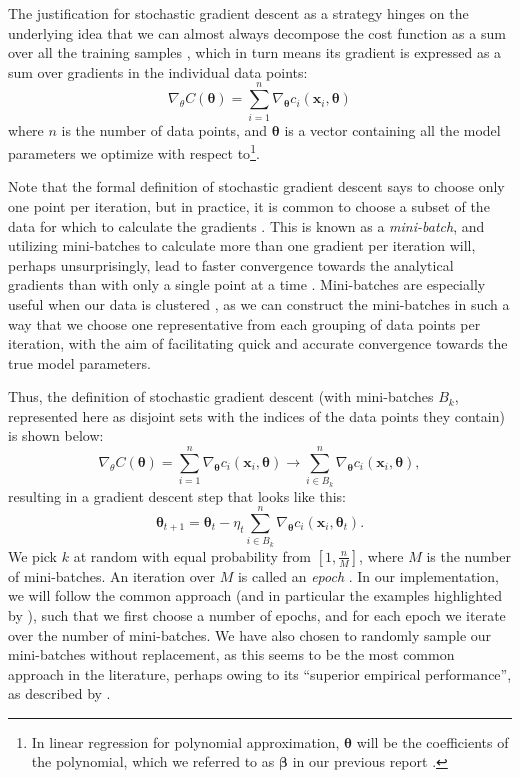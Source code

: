 The justification for stochastic gradient descent as a strategy hinges on the underlying idea that we can almost always decompose the cost function as a sum over all the training samples \cite{deeplearningbookChapter8}, which in turn means its gradient is expressed as a sum over gradients in the individual data points:
\[
\nabla_\theta C(\boldsymbol{\theta}) = \sum_{i=1}^n \nabla_{\boldsymbol{\theta}} c_i (\boldsymbol{x}_i, \boldsymbol{\theta})
\]
where $n$ is the number of data points, and $\boldsymbol{\theta}$ is a vector containing all the model parameters we optimize with respect to\footnote{In linear regression for polynomial approximation, $\boldsymbol{\theta}$ will be the coefficients of the polynomial, which we referred to as $\boldsymbol{\beta}$ in our previous report \cite{fysstkproject1}.}. 

Note that the formal definition of stochastic gradient descent says to choose only one point per iteration, but in practice, it is common to choose a subset of the data for which to calculate the gradients \cite{MHJweek39}. This is known as a \emph{mini-batch}, and utilizing mini-batches to calculate more than one gradient per iteration will, perhaps unsurprisingly, lead to faster convergence towards the analytical gradients than with only a single point at a time \cite{MHJweek39}. Mini-batches are especially useful when our data is clustered \cite{sgdYouTube}, as we can construct the mini-batches in such a way that we choose one representative from each grouping of data points per iteration, with the aim of facilitating quick and accurate convergence towards the true model parameters.

Thus, the definition of stochastic gradient descent (with mini-batches $B_k$, represented here as disjoint sets with the indices of the data points they contain) is shown below:
\[
\nabla_\theta C(\boldsymbol{\theta}) = \sum_{i=1}^n \nabla_{\boldsymbol{\theta}} c_i (\boldsymbol{x}_i, \boldsymbol{\theta}) \rightarrow \sum_{i \in B_k}^n \nabla_{\boldsymbol{\theta}} c_i (\boldsymbol{x}_i, \boldsymbol{\theta} ),
\]
resulting in a gradient descent step that looks like this:
\[
\boldsymbol{\theta}_{t+1} = \boldsymbol{\theta}_t - \eta_t \sum_{i \in B_k}^n \nabla_{\boldsymbol{\theta}} c_i (\boldsymbol{x}_i, \boldsymbol{\theta}_t ).
\]
We pick $k$ at random with equal probability from $[1, \frac{n}{M}]$, where $M$ is the number of mini-batches. An iteration over $M$ is called an \emph{epoch} \cite{MHJweek39}. In our implementation, we will follow the common approach (and in particular the examples highlighted by \textcite{MHJweek39}), such that we first choose a number of epochs, and for each epoch we iterate over the number of mini-batches. We have also chosen to randomly sample our mini-batches without replacement, as this seems to be the most common approach in the literature, perhaps owing to its ``superior empirical performance'', as described by \textcite{machinelearningFAQ}.

